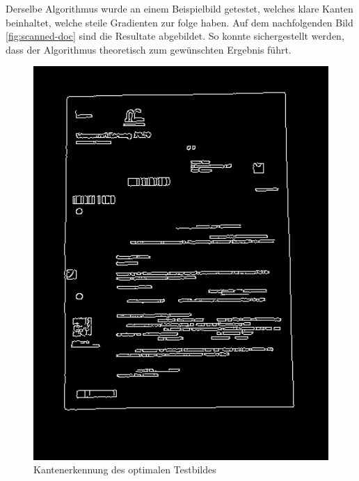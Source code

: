 Derselbe Algorithmus wurde an einem Beispielbild getestet, welches klare Kanten beinhaltet, welche steile Gradienten zur folge haben. Auf dem nachfolgenden Bild \ref{fig:scanned-doc} sind die Resultate abgebildet. So konnte sichergestellt werden, dass der Algorithmus theoretisch zum gewünschten Ergebnis führt.

\begin{figure}[H]
  \centering
  \begin{minipage}[t]{0.32\linewidth}
  \includegraphics[width=1.0\textwidth]{img/piktogrammerkennung/edge_doc.jpg}
  \caption{Kantenerkennung des optimalen Testbildes}
  \label{fig:edge-doc}
  \end{minipage} 
  \hfill
  \begin{minipage}[t]{0.32\linewidth}

\end{minipage}
\end{figure}
